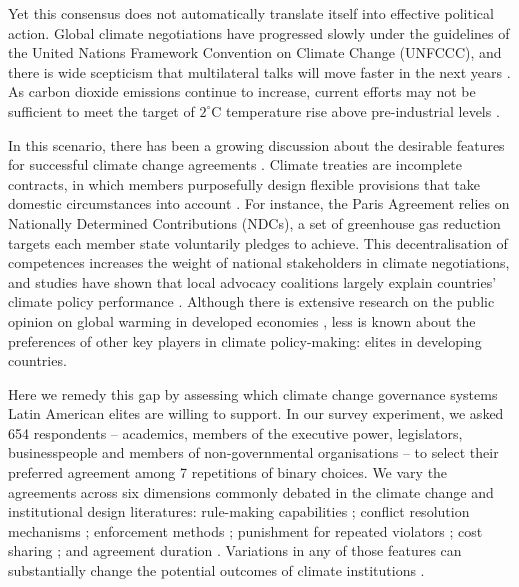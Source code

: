 \documentclass[a4paper,12pt]{article}
\begin{document}
Yet this consensus does not automatically translate itself into effective political action. Global climate negotiations have progressed slowly under the guidelines of the United Nations Framework Convention on Climate Change (UNFCCC), and there is wide scepticism that multilateral talks will move faster in the next years \citep{cole2015advantages, hjerpe2015views}. As carbon dioxide emissions continue to increase, current efforts may not be sufficient to meet the target of $2^{\circ}$C temperature rise above pre-industrial levels \citep{jordan2015emergence}.

In this scenario, there has been a growing discussion about the desirable features for successful climate change agreements \citep{bechtel2013mass, bechtel2017interests, keohane2011regime}. Climate treaties are incomplete contracts, in which members purposefully design flexible provisions that take domestic circumstances into account \citep[607]{brauninger2000making}. For instance, the Paris Agreement relies on Nationally Determined Contributions (NDCs), a set of greenhouse gas reduction targets each member state voluntarily pledges to achieve. This decentralisation of competences increases the weight of national stakeholders in climate negotiations, and studies have shown that local advocacy coalitions largely explain countries' climate policy performance \citep{jahn2016politics,karapin2012explaining}. Although there is extensive research on the public opinion on global warming in developed economies \citep{bechtel2013mass, bechtel2017interests, beiser2019commitment, buntaine2018preferences, mildenberger2017beliefs}, less is known about the preferences of other key players in climate policy-making: elites in developing countries. 

Here we remedy this gap by assessing which climate change governance systems Latin American elites are willing to support. In our survey experiment, we asked 654 respondents -- academics, members of the executive power, legislators, businesspeople and members of non-governmental organisations -- to select their preferred agreement among 7 repetitions of binary choices. We vary the agreements across six dimensions commonly debated in the climate change and institutional design literatures: rule-making capabilities \citep{dubash2013developments, massey2014climate}; conflict resolution mechanisms \citep{huntjens2012institutional, ostrom2014polycentric}; enforcement methods \citep{barrett2008climate}; punishment for repeated violators \citep{ostrom1990governing}; cost sharing \citep{bechtel2013mass}; and agreement duration \citep{copelovitch2014design, marcoux2009institutional}. Variations in any of those features can substantially change the potential outcomes of climate institutions \citep{bodin2017collaborative, ostrom2014polycentric}.
\end{document}
